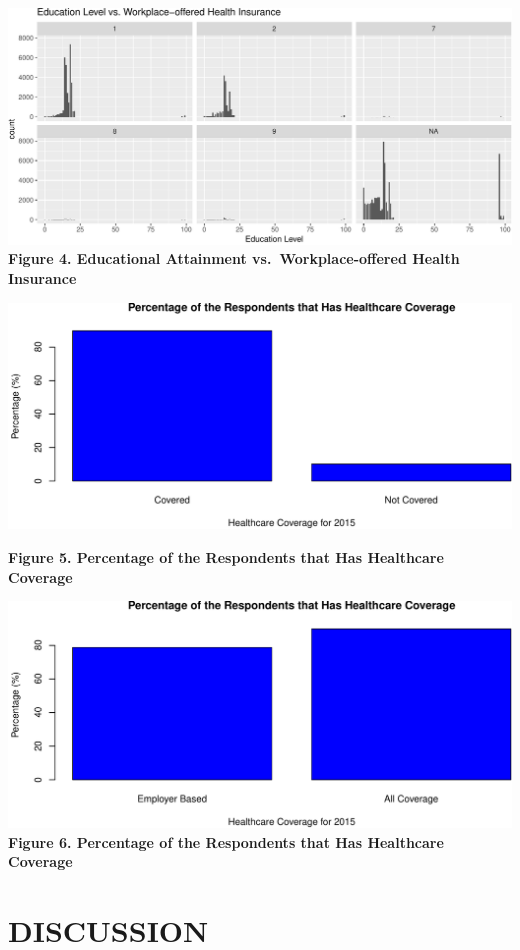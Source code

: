 \documentclass[10pt,]{article}
\makeatletter
\def\maxwidth{\ifdim\Gin@nat@width>\linewidth\linewidth
\else\Gin@nat@width\fi}
\let\Oldincludegraphics\includegraphics
\renewcommand{\includegraphics}[1]{\Oldincludegraphics[width=\maxwidth]{#1}}
\makeatother
\begin{document}
\smallskip

\includegraphics{paper_files/figure-latex/workhealthinsuranceeduattainment-1.pdf}
\textbf{Figure 4. Educational Attainment vs.~Workplace-offered Health
Insurance}

\includegraphics{paper_files/figure-latex/hi2015-1.pdf}

\textbf{Figure 5. Percentage of the Respondents that Has Healthcare
Coverage}

\includegraphics{paper_files/figure-latex/hi2015employer-1.pdf}
\textbf{Figure 6. Percentage of the Respondents that Has Healthcare
Coverage}

\section{DISCUSSION}\label{discussion}
\end{document}
